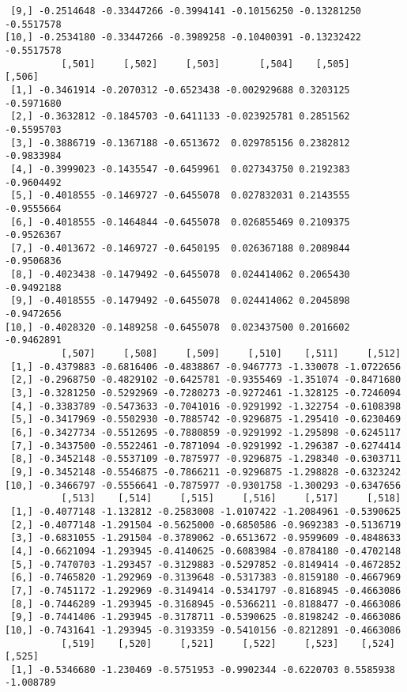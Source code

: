 \documentclass[
  letterpaper,
  DIV=11,
  numbers=noendperiod]{scrreprt}
\begin{document}
\begin{verbatim}
 [9,] -0.2514648 -0.33447266 -0.3994141 -0.10156250 -0.13281250 -0.5517578
[10,] -0.2534180 -0.33447266 -0.3989258 -0.10400391 -0.13232422 -0.5517578
          [,501]     [,502]     [,503]       [,504]    [,505]     [,506]
 [1,] -0.3461914 -0.2070312 -0.6523438 -0.002929688 0.3203125 -0.5971680
 [2,] -0.3632812 -0.1845703 -0.6411133 -0.023925781 0.2851562 -0.5595703
 [3,] -0.3886719 -0.1367188 -0.6513672  0.029785156 0.2382812 -0.9833984
 [4,] -0.3999023 -0.1435547 -0.6459961  0.027343750 0.2192383 -0.9604492
 [5,] -0.4018555 -0.1469727 -0.6455078  0.027832031 0.2143555 -0.9555664
 [6,] -0.4018555 -0.1464844 -0.6455078  0.026855469 0.2109375 -0.9526367
 [7,] -0.4013672 -0.1469727 -0.6450195  0.026367188 0.2089844 -0.9506836
 [8,] -0.4023438 -0.1479492 -0.6455078  0.024414062 0.2065430 -0.9492188
 [9,] -0.4018555 -0.1479492 -0.6455078  0.024414062 0.2045898 -0.9472656
[10,] -0.4028320 -0.1489258 -0.6455078  0.023437500 0.2016602 -0.9462891
          [,507]     [,508]     [,509]     [,510]    [,511]     [,512]
 [1,] -0.4379883 -0.6816406 -0.4838867 -0.9467773 -1.330078 -1.0722656
 [2,] -0.2968750 -0.4829102 -0.6425781 -0.9355469 -1.351074 -0.8471680
 [3,] -0.3281250 -0.5292969 -0.7280273 -0.9272461 -1.328125 -0.7246094
 [4,] -0.3383789 -0.5473633 -0.7041016 -0.9291992 -1.322754 -0.6108398
 [5,] -0.3417969 -0.5502930 -0.7885742 -0.9296875 -1.295410 -0.6230469
 [6,] -0.3427734 -0.5512695 -0.7880859 -0.9291992 -1.295898 -0.6245117
 [7,] -0.3437500 -0.5522461 -0.7871094 -0.9291992 -1.296387 -0.6274414
 [8,] -0.3452148 -0.5537109 -0.7875977 -0.9296875 -1.298340 -0.6303711
 [9,] -0.3452148 -0.5546875 -0.7866211 -0.9296875 -1.298828 -0.6323242
[10,] -0.3466797 -0.5556641 -0.7875977 -0.9301758 -1.300293 -0.6347656
          [,513]    [,514]     [,515]     [,516]     [,517]     [,518]
 [1,] -0.4077148 -1.132812 -0.2583008 -1.0107422 -1.2084961 -0.5390625
 [2,] -0.4077148 -1.291504 -0.5625000 -0.6850586 -0.9692383 -0.5136719
 [3,] -0.6831055 -1.291504 -0.3789062 -0.6513672 -0.9599609 -0.4848633
 [4,] -0.6621094 -1.293945 -0.4140625 -0.6083984 -0.8784180 -0.4702148
 [5,] -0.7470703 -1.293457 -0.3129883 -0.5297852 -0.8149414 -0.4672852
 [6,] -0.7465820 -1.292969 -0.3139648 -0.5317383 -0.8159180 -0.4667969
 [7,] -0.7451172 -1.292969 -0.3149414 -0.5341797 -0.8168945 -0.4663086
 [8,] -0.7446289 -1.293945 -0.3168945 -0.5366211 -0.8188477 -0.4663086
 [9,] -0.7441406 -1.293945 -0.3178711 -0.5390625 -0.8198242 -0.4663086
[10,] -0.7431641 -1.293945 -0.3193359 -0.5410156 -0.8212891 -0.4663086
          [,519]    [,520]     [,521]     [,522]     [,523]    [,524]    [,525]
 [1,] -0.5346680 -1.230469 -0.5751953 -0.9902344 -0.6220703 0.5585938 -1.008789

\end{verbatim}
\end{document}
